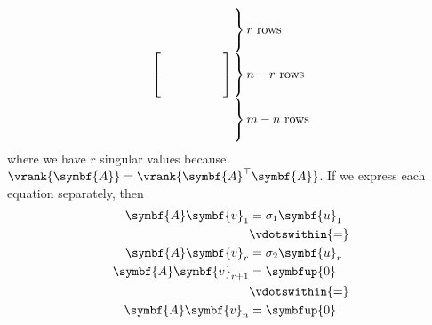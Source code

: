 \documentclass{article}
\begin{document}
\begin{align*}
\begin{bmatrix}
                 &        &          &   &        &   \\
                 &        &          &   &        &   \\
                 &        &          &   &        &
    \end{bmatrix}
    \setlength{\arraycolsep}{0pt} %
    \begin{array}{ l }
        \left.\kern-\nulldelimiterspace
        \vphantom{
            \begin{array}{ c }
                0 \\ %
                0 \\ %
                0     %
            \end{array}
        }
        \right\}\text{\(r\) rows}     \\
        \left.\kern-\nulldelimiterspace
        \vphantom{
            \begin{array}{ c }
                0 \\ %
                0 \\ %
                0     %
            \end{array}
        }
        \right\}\text{\(n - r\) rows} \\
        \left.\kern-\nulldelimiterspace
        \vphantom{
            \begin{array}{ c }
                0 \\ %
                0 \\ %
                0     %
            \end{array}
        }
        \right\}\text{\(m - n\) rows}
    \end{array}
\end{align*}
where we have \(r\) singular values because \(\vrank{\symbf{A}} = \vrank{\symbf{A}^\top \symbf{A}}\).
If we express each equation separately, then
\begin{align*}
    \symbf{A} \symbf{v}_1       & = \sigma_1 \symbf{u}_1 \\
                                & \vdotswithin{=}        \\
    \symbf{A} \symbf{v}_r       & = \sigma_2 \symbf{u}_r \\
    \symbf{A} \symbf{v}_{r + 1} & = \symbfup{0}          \\
                                & \vdotswithin{=}        \\
    \symbf{A} \symbf{v}_{n}     & = \symbfup{0}
\end{align*}
\end{document}

